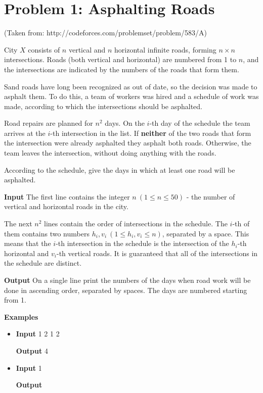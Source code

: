 \normalfont\documentclass[letterpaper,11pt]{article}
\begin{document}
\section*{Problem 1: Asphalting Roads}
(Taken from: http://codeforces.com/problemset/problem/583/A)

City $X$ consists of $n$ vertical and $n$ horizontal infinite roads, forming $n \times n$ intersections. Roads (both vertical and horizontal) are numbered from 1 to $n$, and the intersections are indicated by the numbers of the roads that form them.

Sand roads have long been recognized as out of date, so the decision was made to asphalt them. To do this, a team of workers was hired and a schedule of work was made, according to which the intersections should be asphalted.

Road repairs are planned for $n^2$ days. On the $i$-th day of the schedule the team arrives at the $i$-th intersection in the list. If \textbf{neither} of the two roads that form the intersection were already asphalted they asphalt both roads. Otherwise, the team leaves the intersection, without doing anything with the roads.

According to the schedule, give the days in which at least one road will be asphalted.

\textbf{Input} \newline
The first line contains the integer $n \ (1 \leq n \leq 50)$ - the number of vertical and horizontal roads in the city.

The next $n^2$ lines contain the order of intersections in the schedule. The $i$-th of them contains two numbers $h_i, v_i \ (1 \leq h_i, v_i \leq n)$, separated by a space. This means that the $i$-th intersection in the schedule is the intersection of the $h_i$-th horizontal and $v_i$-th vertical roads. It is guaranteed that all of the intersections in the schedule are distinct.

\textbf{Output} \newline
On a single line print the numbers of the days when road work will be done in ascending order, separated by spaces. The days are numbered starting from 1.

\textbf{Examples}
\begin{itemize}
\item \textbf{Input}   1  2  1  2

\textbf{Output}  4

\item \textbf{Input}   1

\textbf{Output} 
\end{itemize}
\newpage
\end{document}
